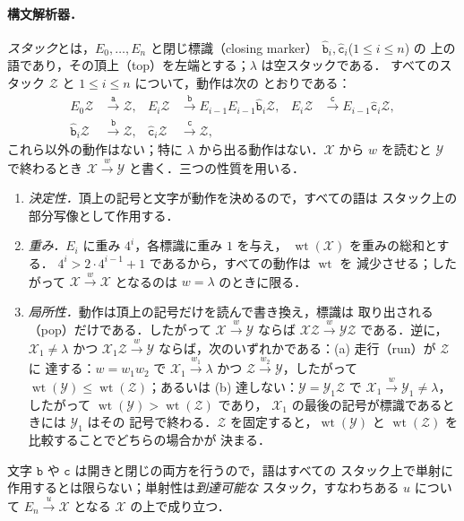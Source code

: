 \documentclass[11pt,a4paper]{ltjsarticle}
\numberwithin{equation}{section}
\theoremstyle{plain}
\theoremstyle{definition}
\theoremstyle{remark}
\theoremstyle{plain}
\newcommand{\eps}{\lambda}
\begin{document}
\paragraph{構文解析器．}
\emph{スタック}とは，$E_0,\ldots,E_n$ と閉じ標識（closing marker）
$\hat{\mathtt b}_i,\hat{\mathtt c}_i$\textup($1\le i\le n$\textup) の
上の語であり，その頂上（top）を左端とする；$\eps$ は空スタックである．
すべてのスタック $\mathcal Z$ と $1\le i\le n$ について，動作は次の
とおりである：
\[
\begin{aligned}
E_0\mathcal Z&\xrightarrow{\mathtt a}\mathcal Z,&
E_i\mathcal Z&\xrightarrow{\mathtt b}E_{i-1}E_{i-1}\hat{\mathtt b}_i\mathcal Z,&
E_i\mathcal Z&\xrightarrow{\mathtt c}E_{i-1}\hat{\mathtt c}_i\mathcal Z,\\
\hat{\mathtt b}_i\mathcal Z&\xrightarrow{\mathtt b}\mathcal Z,&
\hat{\mathtt c}_i\mathcal Z&\xrightarrow{\mathtt c}\mathcal Z,
\end{aligned}
\]
これら以外の動作はない；特に $\eps$ から出る動作はない．$\mathcal X$ から
$w$ を読むと $\mathcal Y$ で終わるとき $\mathcal X\xrightarrow{w}\mathcal Y$
と書く．三つの性質を用いる．
\begin{enumerate}[label=\textup{(D\arabic*)},leftmargin=2.6em]
\item \emph{決定性．}頂上の記号と文字が動作を決めるので，すべての語は
スタック上の部分写像として作用する．
\item \emph{重み．}$E_i$ に重み $4^i$，各標識に重み $1$ を与え，
$\operatorname{wt}(\mathcal X)$ を重みの総和とする．
$4^i>2\cdot4^{i-1}+1$ であるから，すべての動作は $\operatorname{wt}$ を
減少させる；したがって $\mathcal X\xrightarrow{w}\mathcal X$ となるのは
$w=\eps$ のときに限る．
\item \emph{局所性．}動作は頂上の記号だけを読んで書き換え，標識は
取り出される（pop）だけである．したがって
$\mathcal X\xrightarrow{w}\mathcal Y$ ならば
$\mathcal X\mathcal Z\xrightarrow{w}\mathcal Y\mathcal Z$ である．逆に，
$\mathcal X_1\ne\eps$ かつ $\mathcal X_1\mathcal Z\xrightarrow{w}\mathcal Y$
ならば，次のいずれかである：\textup{(a)} 走行（run）が $\mathcal Z$ に
達する：$w=w_1w_2$ で $\mathcal X_1\xrightarrow{w_1}\eps$ かつ
$\mathcal Z\xrightarrow{w_2}\mathcal Y$，したがって
$\operatorname{wt}(\mathcal Y)\le\operatorname{wt}(\mathcal Z)$；あるいは
\textup{(b)} 達しない：$\mathcal Y=\mathcal Y_1\mathcal Z$ で
$\mathcal X_1\xrightarrow{w}\mathcal Y_1\ne\eps$，したがって
$\operatorname{wt}(\mathcal Y)>\operatorname{wt}(\mathcal Z)$ であり，
$\mathcal X_1$ の最後の記号が標識であるときには $\mathcal Y_1$ はその
記号で終わる．$\mathcal Z$ を固定すると，$\operatorname{wt}(\mathcal Y)$
と $\operatorname{wt}(\mathcal Z)$ を比較することでどちらの場合かが
決まる．
\end{enumerate}
文字 $\mathtt b$ や $\mathtt c$ は開きと閉じの両方を行うので，語はすべての
スタック上で単射に作用するとは限らない；単射性は\emph{到達可能な}
スタック，すなわちある $u$ について $E_n\xrightarrow{u}\mathcal X$ となる
$\mathcal X$ の上で成り立つ．
\end{document}
